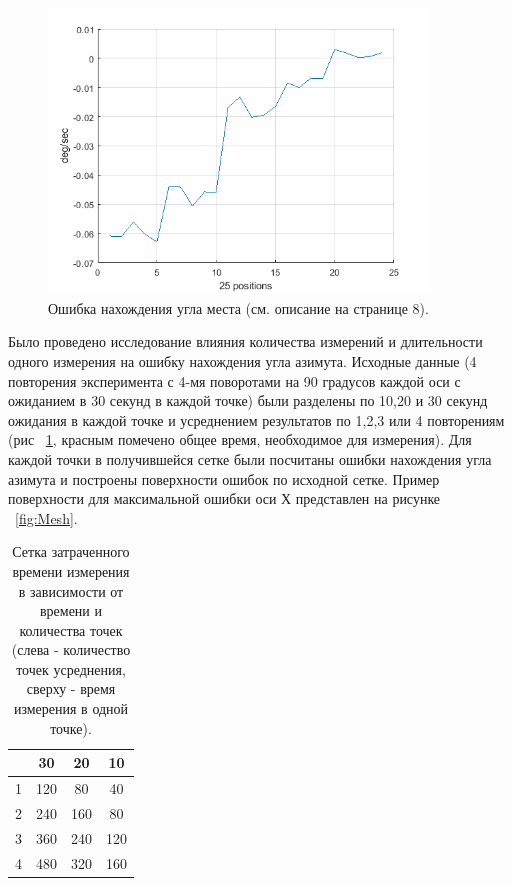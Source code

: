 \documentclass[a4paper,12pt]{article}
\begin{document}
\begin{figure}[h!] 
\centering
\includegraphics[width=0.9\textwidth]{Elev_err.png} 
\caption{\label{fig:Elev} Ошибка нахождения угла места (см. описание на странице 8).}
\end{figure}

Было проведено исследование влияния количества измерений и длительности одного измерения на ошибку нахождения угла азимута.  Исходные данные (4 повторения эксперимента с 4-мя поворотами на 90 градусов каждой оси с ожиданием в 30 секунд в каждой точке) были разделены по 10,20 и 30 секунд ожидания в каждой точке и усреднением результатов по 1,2,3 или 4 повторениям (рис ~\ref{fig:Matrix}, красным помечено общее время, необходимое для измерения).  Для каждой точки в получившейся сетке были посчитаны ошибки нахождения угла азимута и построены поверхности ошибок по исходной сетке. Пример поверхности для максимальной ошибки оси Х представлен на рисунке ~\ref{fig:Mesh}. 
\begin{table}[h]

\begin{center}
\begin{tabular}{ c | c | c | c }

   & 30 & 20 & 10 \\  \hline
 1 & 120 & 80 &  40\\  
 2 & 240 & 160 & 80\\  
 3 & 360 & 240 & 120\\
 4 & 480 & 320 & 160
\end{tabular}
\end{center}
\caption{\label{fig:Matrix}Сетка затраченного времени измерения в зависимости от времени и количества точек (слева - количество точек усреднения, сверху - время измерения в одной точке).}
\end{table}
\end{document}

